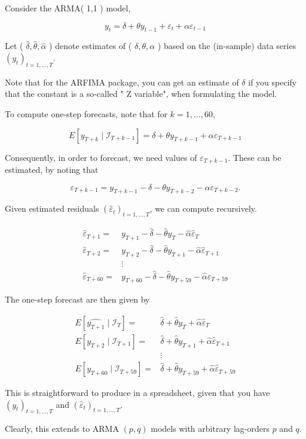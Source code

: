 Consider the ARMA( 1,1 ) model,

$$
y_t=\delta+\theta y_{t-1}+\varepsilon_t+\alpha \varepsilon_{t-1}
$$


Let ( $\hat{\delta}, \hat{\theta}, \hat{\alpha}$ ) denote estimates of ( $\delta, \theta, \alpha$ ) based on the (in-sample) data series $\left(y_t\right)_{t=1, \ldots, T}$.

Note that for the ARFIMA package, you can get an estimate of $\delta$ if you specify that the constant is a so-called " Z variable", when formulating the model.

To compute one-step forecasts, note that for $k=1, \ldots, 60$,

$$
E\left[y_{T+k} \mid \mathcal{I}_{T+k-1}\right]=\delta+\theta y_{T+k-1}+\alpha \varepsilon_{T+k-1}
$$


Consequently, in order to forecast, we need values of $\varepsilon_{T+k-1}$. These can be estimated, by noting that

$$
\varepsilon_{T+k-1}=y_{T+k-1}-\delta-\theta y_{T+k-2}-\alpha \varepsilon_{T+k-2} .
$$


Given estimated residuals $\left(\hat{\varepsilon}_t\right)_{t=1, \ldots, T}$, we can compute recursively.

$$
\begin{aligned}
\hat{\varepsilon}_{T+1}= & y_{T+1}-\hat{\delta}-\hat{\theta} y_T-\hat{\alpha} \hat{\varepsilon}_T \\
\hat{\varepsilon}_{T+2}= & y_{T+2}-\hat{\delta}-\hat{\theta} y_{T+1}-\hat{\alpha} \hat{\varepsilon}_{T+1} \\
& \vdots \\
\hat{\varepsilon}_{T+60}= & y_{T+60}-\hat{\delta}-\hat{\theta} y_{T+59}-\hat{\alpha} \hat{\varepsilon}_{T+59}
\end{aligned}
$$


The one-step forecast are then given by

$$
\begin{aligned}
E\left[\widehat{y_{T+1}} \mid \mathcal{I}_T\right]= & \hat{\delta}+\hat{\theta} y_T+\hat{\alpha} \hat{\varepsilon}_T \\
E\left[y_{T+2} \mid \mathcal{I}_{T+1}\right]= & \hat{\delta}+\hat{\theta} y_{T+1}+\hat{\alpha} \hat{\varepsilon}_{T+1} \\
& \vdots \\
E\left[y_{T+60} \mid \mathcal{I}_{T+59}\right]= & \hat{\delta}+\hat{\theta} y_{T+59}+\hat{\alpha} \hat{\varepsilon}_{T+59}
\end{aligned}
$$


This is straightforward to produce in a spreadsheet, given that you have $\left(y_t\right)_{t=1, \ldots, T}$ and $\left(\hat{\varepsilon}_t\right)_{t=1, \ldots, T}$.

Clearly, this extends to ARMA $(p, q)$ models with arbitrary lag-orders $p$ and $q$.